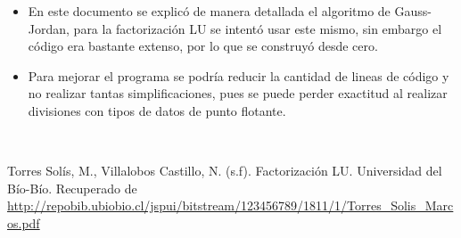 \documentclass[letterpaper,12pt]{article}
\begin{document}
\begin{itemize}
    \item En este documento se explicó de manera detallada el algoritmo de Gauss-Jordan, para la factorización LU se intentó usar este mismo, sin embargo el código era bastante extenso, por lo que se construyó desde cero.
    \item Para mejorar el programa se podría reducir la cantidad de lineas de código y no realizar tantas simplificaciones, pues se puede perder exactitud al realizar divisiones con tipos de datos de punto flotante.
\end{itemize}
\\
\begin{thebibliography}{99}
Torres Solís, M., Villalobos Castillo, N. (s.f). Factorización LU. Universidad del Bío-Bío. Recuperado de \url{http://repobib.ubiobio.cl/jspui/bitstream/123456789/1811/1/Torres_Solis_Marcos.pdf}
\end{thebibliography}
\end{document}
